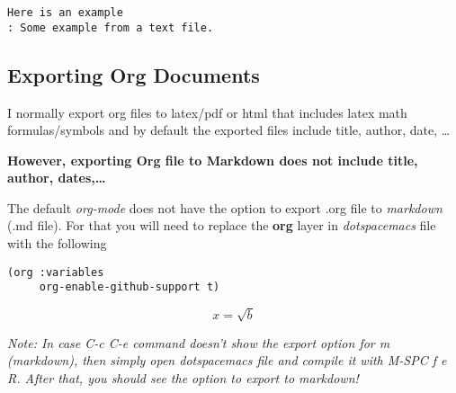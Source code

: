 \documentclass[11pt]{article}
\begin{document}
\begin{verbatim}
Here is an example
: Some example from a text file. 
\end{verbatim}


\subsection{Exporting Org Documents}
\label{sec:org0b4dc83}

I normally export org files to latex/pdf or html that includes latex math formulas/symbols and by default the exported files include title, author, date, \ldots{}  

\textbf{However, exporting Org file to Markdown does not include title, author, dates,\ldots{}} 

The default \emph{org-mode} does not have the option to export .org file to \emph{markdown} (.md file).   For that you will need to replace the \textbf{org} layer in \emph{dotspacemacs} file   with the   following 

\begin{verbatim}
(org :variables
     org-enable-github-support t)
\end{verbatim}


$$x = \sqrt{b}$$


\emph{Note: In case C-c C-e command doesn't show the export option for m (markdown), then simply open dotspacemacs file and compile it with M-SPC f e R. After that, you should see the option to export to markdown!} 
\end{document}
